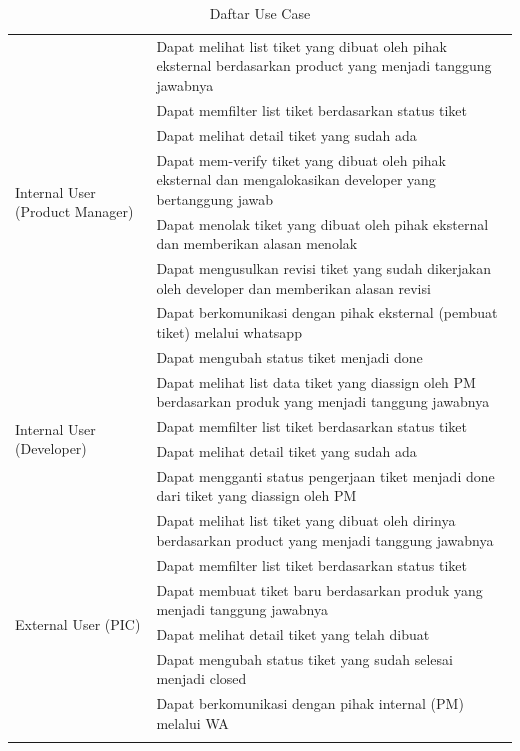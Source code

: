 \documentclass[12pt]{article}
\begin{document}
\begin{enumerate}[label=\textbf{4.\arabic*.}]
\begin{enumerate}[label=\textbf{4.1.\arabic*.}, wide, labelwidth=!, labelindent=0pt]
\begin{longtable}{|l|p{}|}
            \multirow{8}{*}{Internal User (Product Manager)} 
            & Dapat melihat list tiket yang dibuat oleh pihak eksternal berdasarkan product yang menjadi tanggung jawabnya \\\cline{2-2}
            & Dapat memfilter list tiket berdasarkan status tiket \\\cline{2-2} 
            & Dapat melihat detail tiket yang sudah ada \\\cline{2-2}
            & Dapat mem-verify tiket yang dibuat oleh pihak eksternal dan 
            mengalokasikan developer yang bertanggung jawab \\\cline{2-2}
            & Dapat menolak tiket yang dibuat oleh pihak eksternal dan memberikan alasan menolak \\\cline{2-2}
            & Dapat mengusulkan revisi tiket yang sudah dikerjakan oleh developer dan memberikan alasan revisi \\\cline{2-2}
            & Dapat berkomunikasi dengan pihak eksternal (pembuat tiket) melalui whatsapp \\\cline{2-2}
            & Dapat mengubah status tiket menjadi done \\\cline{2-2}
            \hline
            \multirow{4}{*}{Internal User (Developer)} & Dapat melihat list data tiket yang diassign oleh PM berdasarkan produk yang menjadi tanggung jawabnya \\\cline{2-2}
            & Dapat memfilter list tiket berdasarkan status tiket \\\cline{2-2}
            & Dapat melihat detail tiket yang sudah ada \\\cline{2-2}
            & Dapat mengganti status pengerjaan tiket menjadi done dari tiket yang diassign oleh PM \\\cline{2-2}
            \hline
            \multirow{7}{*}{External User (PIC)} & Dapat melihat list tiket yang dibuat oleh dirinya berdasarkan product yang menjadi tanggung jawabnya \\\cline{2-2}
            & Dapat memfilter list tiket berdasarkan status tiket \\\cline{2-2}
            & Dapat membuat tiket baru berdasarkan produk yang menjadi tanggung jawabnya \\\cline{2-2}
            & Dapat melihat detail tiket yang telah dibuat \\\cline{2-2}
            & Dapat mengubah status tiket yang sudah selesai menjadi closed \\\cline{2-2}
            & Dapat berkomunikasi dengan pihak internal (PM) melalui WA \\\cline{2-2}
            \hline
            \caption{Daftar Use Case}
            \label{table:use-case}
        \end{longtable}
        

\end{enumerate}
\end{enumerate}
\end{document}
